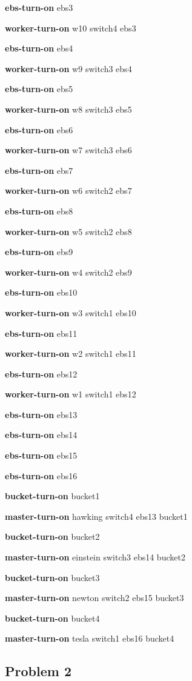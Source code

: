 \documentclass[letterpaper]{article}
\begin{document}
\textbf{ebs-turn-on} ebs3 

\textbf{worker-turn-on} w10 switch4 ebs3 

\textbf{ebs-turn-on} ebs4 

\textbf{worker-turn-on} w9 switch3 ebs4 

\textbf{ebs-turn-on} ebs5 

\textbf{worker-turn-on} w8 switch3 ebs5 

\textbf{ebs-turn-on} ebs6 

\textbf{worker-turn-on} w7 switch3 ebs6 

\textbf{ebs-turn-on} ebs7 

\textbf{worker-turn-on} w6 switch2 ebs7 

\textbf{ebs-turn-on} ebs8 

\textbf{worker-turn-on} w5 switch2 ebs8 

\textbf{ebs-turn-on} ebs9 

\textbf{worker-turn-on} w4 switch2 ebs9 

\textbf{ebs-turn-on} ebs10 

\textbf{worker-turn-on} w3 switch1 ebs10 

\textbf{ebs-turn-on} ebs11 

\textbf{worker-turn-on} w2 switch1 ebs11 

\textbf{ebs-turn-on} ebs12 

\textbf{worker-turn-on} w1 switch1 ebs12 

\textbf{ebs-turn-on} ebs13 

\textbf{ebs-turn-on} ebs14 

\textbf{ebs-turn-on} ebs15 

\textbf{ebs-turn-on} ebs16 

\textbf{bucket-turn-on} bucket1 

\textbf{master-turn-on} hawking switch4 ebs13 bucket1 

\textbf{bucket-turn-on} bucket2 

\textbf{master-turn-on} einstein switch3 ebs14 bucket2 

\textbf{bucket-turn-on} bucket3 

\textbf{master-turn-on} newton switch2 ebs15 bucket3 

\textbf{bucket-turn-on} bucket4 

\textbf{master-turn-on} tesla switch1 ebs16 bucket4

\subsection{Problem 2}\label{sec:experiments2}
\end{document}
